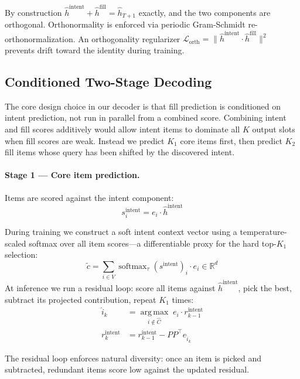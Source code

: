 \documentclass[conference]{IEEEtran}
\begin{document}
By construction $\hat{h}^{\text{intent}} + \hat{h}^{\text{fill}} =
\hat{h}_{T+1}$ exactly, and the two components are orthogonal.
Orthonormality is enforced via periodic Gram-Schmidt
re-orthonormalization. An orthogonality regularizer
$\mathcal{L}_{\text{orth}} = \|\hat{h}^{\text{intent}} \cdot
\hat{h}^{\text{fill}}\|^2$ prevents drift toward the identity during
training.

\subsection{Conditioned Two-Stage Decoding}
\label{subsec:decode}

The core design choice in our decoder is that fill prediction is
conditioned on intent prediction, not run in parallel from a combined
score. Combining intent and fill scores additively would allow intent
items to dominate all $K$ output slots when fill scores are weak.
Instead we predict $K_1$ core items first, then predict $K_2$ fill
items whose query has been shifted by the discovered intent.

\paragraph{Stage 1 --- Core item prediction.}
Items are scored against the intent component:
\begin{equation}
s_i^{\text{intent}} = e_i \cdot \hat{h}^{\text{intent}}
\end{equation}

During training we construct a soft intent context vector using a
temperature-scaled softmax over all item scores---a differentiable
proxy for the hard top-$K_1$ selection:
\begin{equation}
\tilde{c} = \sum_{i \in V} \operatorname{softmax}_\tau(s^{\text{intent}})_i \cdot e_i \in \mathbb{R}^d
\end{equation}
 At inference
we run a residual loop: score all items against $\hat{h}^{\text{intent}}$,
pick the best, subtract its projected contribution, repeat $K_1$ times:
\begin{align}
\hat{i}_k &= \operatorname*{arg\,max}_{i \notin \hat{C}}\; e_i \cdot r_{k-1}^{\text{intent}} \\
r_k^{\text{intent}} &= r_{k-1}^{\text{intent}} - PP^\top e_{\hat{i}_k}
\end{align}

The residual loop enforces natural diversity: once an item is picked and
subtracted, redundant items score low against the updated residual.
\end{document}

